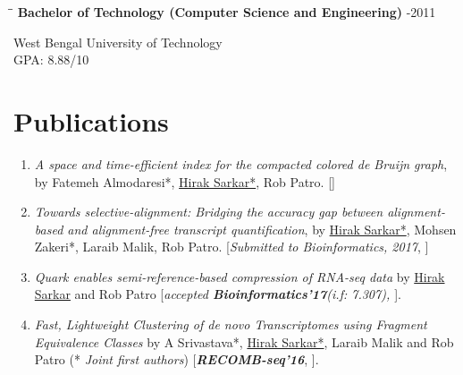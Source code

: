 \documentclass{res}
\begin{document}
\begin{resume}
\vspace{-0.1in}	
\begin{tabbing}
\hspace{2.3in}\= \hspace{2.6in}\= \kill %
{\bf Bachelor of Technology (Computer Science and Engineering)}  \>     -2011
\end{tabbing}  \vspace{-20pt}      %
West Bengal University of Technology     \\       
GPA: 8.88/10      \\   

\vspace{-0.9cm}
\section{Publications}
\begin{enumerate}

\item {\it A space and time-efficient index for the compacted colored de Bruijn graph}, by Fatemeh Almodaresi*, \underline{Hirak Sarkar*}, Rob Patro. [\textit{\href{https://doi.org/10.1101/191874}{\color{blue}{bioRxiv'17}}}]


\item {\it Towards selective-alignment: Bridging the accuracy gap between alignment-based and alignment-free transcript quantification}, by \underline{Hirak Sarkar*}, Mohsen Zakeri*, Laraib Malik, Rob Patro. [\textit{Submitted to Bioinformatics, 2017}, \textit{\href{https://doi.org/10.1101/138800}{\color{blue}{bioRxiv'17}}}]

\item   {\it Quark enables semi-reference-based compression of RNA-seq data} by  \underline{Hirak Sarkar} and Rob Patro [\textit{accepted \textbf {Bioinformatics'17}(i.f: 7.307), \href{http://dx.doi.org/10.1101/085878}{\color{blue}{bioRxiv'16}}}].


\item   {\it Fast, Lightweight Clustering of de novo Transcriptomes using Fragment Equivalence Classes} by A Srivastava*, \underline{Hirak Sarkar*}, Laraib Malik and Rob Patro (* \textit{Joint first authors}) [\textit{\textbf{RECOMB-seq'16}}, \textit{\href{http://arxiv.org/pdf/1604.03250v1.pdf}{\color{blue}{arXiv'16}}}]. 



\end{enumerate}
\end{resume}
\end{document}
